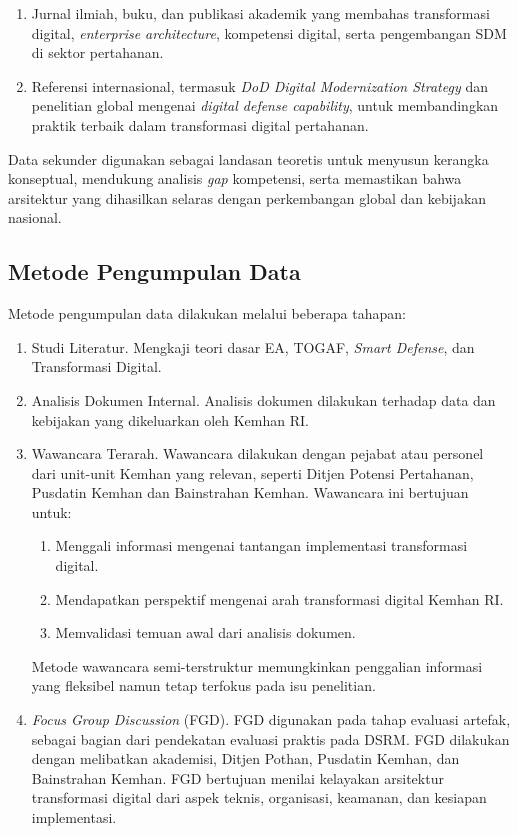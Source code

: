 \begin{enumerate}
\begin{enumerate}
    \item Jurnal ilmiah, buku, dan publikasi akademik yang membahas transformasi digital, \textit{enterprise architecture}, kompetensi digital, serta pengembangan SDM di sektor pertahanan.
    \item Referensi internasional, termasuk \textit{DoD Digital Modernization Strategy} dan penelitian global mengenai \textit{digital defense capability}, untuk membandingkan praktik terbaik dalam transformasi digital pertahanan.
  \end{enumerate}
  Data sekunder digunakan sebagai landasan teoretis untuk menyusun kerangka konseptual, mendukung analisis \textit{gap} kompetensi, serta memastikan bahwa arsitektur yang dihasilkan selaras dengan perkembangan global dan kebijakan nasional.
\end{enumerate}

\subsection{Metode Pengumpulan Data}
Metode pengumpulan data dilakukan melalui beberapa tahapan:
\begin{enumerate}
  \item Studi Literatur.
  Mengkaji teori dasar EA, TOGAF, \textit{Smart Defense}, dan Transformasi Digital.
  \item Analisis Dokumen Internal.
  Analisis dokumen dilakukan terhadap data dan kebijakan yang dikeluarkan oleh Kemhan RI.
  \item Wawancara Terarah.
  Wawancara dilakukan dengan pejabat atau personel dari unit-unit Kemhan yang relevan, seperti Ditjen Potensi Pertahanan, Pusdatin Kemhan dan Bainstrahan Kemhan. Wawancara ini bertujuan untuk:
  \begin{enumerate}
    \item Menggali informasi mengenai tantangan implementasi transformasi digital.
    \item Mendapatkan perspektif mengenai arah transformasi digital Kemhan RI.
    \item Memvalidasi temuan awal dari analisis dokumen.
  \end{enumerate}
  Metode wawancara semi-terstruktur memungkinkan penggalian informasi yang fleksibel namun tetap terfokus pada isu penelitian.
  \item \textit{Focus Group Discussion} (FGD).
  FGD digunakan pada tahap evaluasi artefak, sebagai bagian dari pendekatan evaluasi praktis pada DSRM. FGD dilakukan dengan melibatkan akademisi, Ditjen Pothan, Pusdatin Kemhan, dan Bainstrahan Kemhan.
  FGD bertujuan menilai kelayakan arsitektur transformasi digital dari aspek teknis, organisasi, keamanan, dan kesiapan implementasi.
\end{enumerate}


